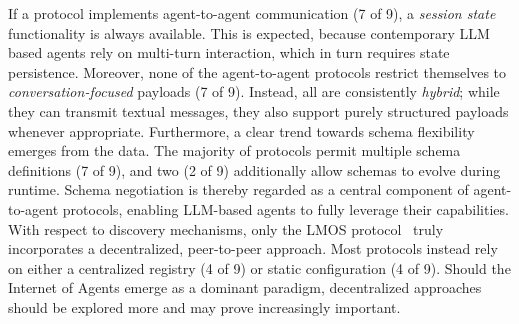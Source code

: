 \documentclass[pdflatex,sn-mathphys-num]{sn-jnl}%
\theoremstyle{thmstyleone}%
\theoremstyle{thmstyletwo}%
\theoremstyle{thmstylethree}%
\begin{document}
If a protocol implements agent-to-agent communication (7 of 9), a \textit{session state} functionality is always available. This is expected, because contemporary LLM based agents rely on multi-turn interaction, which in turn requires state persistence. Moreover, none of the agent-to-agent protocols restrict themselves to \textit{conversation-focused} payloads (7 of 9). Instead, all are consistently \textit{hybrid}; while they can transmit textual messages, they also support purely structured payloads whenever appropriate. Furthermore, a clear trend towards schema flexibility emerges from the data. The majority of protocols permit multiple schema definitions (7 of 9), and two (2 of 9) additionally allow schemas to evolve during runtime. Schema negotiation is thereby regarded as a central component of agent-to-agent protocols, enabling LLM-based agents to fully leverage their capabilities. With respect to discovery mechanisms, only the LMOS protocol~\cite{lmosdiscovery} truly incorporates a decentralized, peer-to-peer approach. Most protocols instead rely on either a centralized registry (4 of 9) or static configuration (4 of 9). Should the Internet of Agents emerge as a dominant paradigm, decentralized approaches should be explored more and may prove increasingly important.
\end{document}
